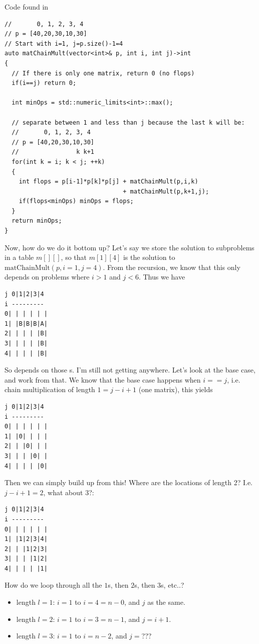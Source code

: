 Code found in 
\begin{lstlisting}[style=raycppnewsnippet]
//       0, 1, 2, 3, 4
// p = [40,20,30,10,30]
// Start with i=1, j=p.size()-1=4
auto matChainMult(vector<int>& p, int i, int j)->int
{
  // If there is only one matrix, return 0 (no flops)
  if(i==j) return 0;

  int minOps = std::numeric_limits<int>::max();

  // separate between 1 and less than j because the last k will be:
  //       0, 1, 2, 3, 4
  // p = [40,20,30,10,30]
  //                k k+1
  for(int k = i; k < j; ++k)
  {
    int flops = p[i-1]*p[k]*p[j] + matChainMult(p,i,k)
                                 + matChainMult(p,k+1,j);
    if(flops<minOps) minOps = flops;
  }
  return minOps;
}
\end{lstlisting}
Now, how do we do it bottom up? Let's say we store the solution to
subproblems in a table $m[][]$, so that $m[1][4]$ is the solution to
$\text{matChainMult}(p,i=1,j=4)$. From the recursion, we know that this only
depends on problems where $i>1$ and $j<6$. Thus we have
\begin{lstlisting}[style=raygeneric]
j 0|1|2|3|4
i ---------
0| | | | | |
1| |B|B|B|A|
2| | | | |B|
3| | | | |B|
4| | | | |B|
\end{lstlisting}
So  depends on those s. I'm still not getting anywhere. Let's
look at the base case, and work from that. We know that the base case
happens when $i==j$, i.e. chain multiplication of length $1=j-i+1$ (one
matrix), this yields
\begin{lstlisting}[style=raygeneric]
j 0|1|2|3|4
i ---------
0| | | | | |
1| |0| | | |
2| | |0| | |
3| | | |0| |
4| | | | |0|
\end{lstlisting}
Then we can simply build up from this! Where are the locations of length 2?
I.e. $j-i+1 = 2$, what about $3$?:
\begin{lstlisting}[style=raygeneric]
j 0|1|2|3|4
i ---------
0| | | | | |
1| |1|2|3|4|
2| | |1|2|3|
3| | | |1|2|
4| | | | |1|
\end{lstlisting}
How do we loop through all the $1$s, then $2$s, then $3$s, etc..?
\begin{itemize}%
\item length $l=1$: $i=1$ to $i=4=n-0$, and  $j$ as the
  same.
\item length $l=2$: $i=1$ to $i=3=n-1$, and $j=i+1$.
\item length $l=3$: $i=1$ to $i=n-2$, and $j=$???
\end{itemize}
